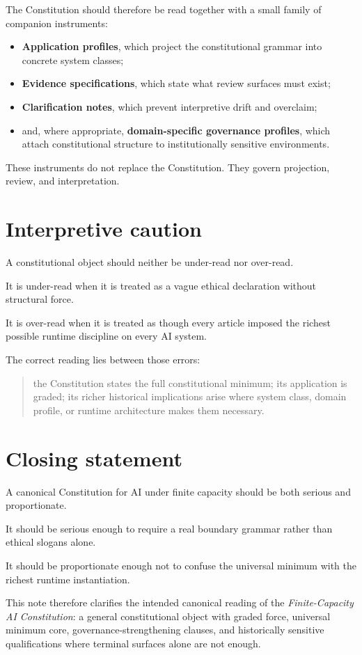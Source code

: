 \documentclass[11pt]{article}
\begin{document}
The Constitution should therefore be read together with a small family of companion instruments:
\begin{itemize}[leftmargin=2em]
    \item \textbf{Application profiles}, which project the constitutional grammar into concrete system classes;
    \item \textbf{Evidence specifications}, which state what review surfaces must exist;
    \item \textbf{Clarification notes}, which prevent interpretive drift and overclaim;
    \item and, where appropriate, \textbf{domain-specific governance profiles}, which attach constitutional structure to institutionally sensitive environments.
\end{itemize}

These instruments do not replace the Constitution. They govern projection, review, and interpretation.

\section{Interpretive caution}

A constitutional object should neither be under-read nor over-read.

It is under-read when it is treated as a vague ethical declaration without structural force.

It is over-read when it is treated as though every article imposed the richest possible runtime discipline on every AI system.

The correct reading lies between those errors:
\begin{quote}
the Constitution states the full constitutional minimum; its application is graded; its richer historical implications arise where system class, domain profile, or runtime architecture makes them necessary.
\end{quote}

\section{Closing statement}

A canonical Constitution for AI under finite capacity should be both serious and proportionate.

It should be serious enough to require a real boundary grammar rather than ethical slogans alone.

It should be proportionate enough not to confuse the universal minimum with the richest runtime instantiation.

This note therefore clarifies the intended canonical reading of the \emph{Finite-Capacity AI Constitution}: a general constitutional object with graded force, universal minimum core, governance-strengthening clauses, and historically sensitive qualifications where terminal surfaces alone are not enough.
\end{document}
